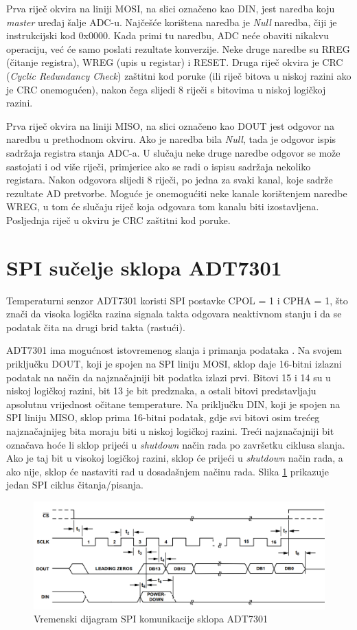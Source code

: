Prva riječ okvira na liniji MOSI, na slici označeno kao DIN, jest naredba koju \textit{master} uređaj šalje ADC-u. Najčešće korištena naredba je \textit{Null} naredba, čiji je instrukcijski kod 0x0000. Kada primi tu naredbu, ADC neće obaviti nikakvu operaciju, već će samo poslati rezultate konverzije. Neke druge naredbe su RREG (čitanje registra), WREG (upis u registar) i RESET. Druga riječ okvira je CRC (\textit{Cyclic Redundancy Check}) zaštitni kod poruke (ili riječ bitova u niskoj razini ako je CRC onemogućen), nakon čega slijedi 8 riječi s bitovima u niskoj logičkoj razini.

Prva riječ okvira na liniji MISO, na slici označeno kao DOUT jest odgovor na naredbu u prethodnom okviru. Ako je naredba bila \textit{Null}, tada je odgovor ispis sadržaja registra stanja ADC-a. U slučaju neke druge naredbe odgovor se može sastojati i od više riječi, primjerice ako se radi o ispisu sadržaja nekoliko registara. Nakon odgovora slijedi 8 riječi, po jedna za svaki kanal, koje sadrže rezultate AD pretvorbe. Moguće je onemogućiti neke kanale korištenjem naredbe WREG, u tom će slučaju riječ koja odgovara tom kanalu biti izostavljena. Posljednja riječ u okviru je CRC zaštitni kod poruke.


\section{SPI sučelje sklopa ADT7301}
Temperaturni senzor ADT7301 koristi SPI postavke CPOL = 1 i CPHA = 1, što znači da visoka logička razina signala takta odgovara neaktivnom stanju i da se podatak čita na drugi brid takta (rastući).

ADT7301 ima mogućnost istovremenog slanja i primanja podataka . Na svojem priključku DOUT, koji je spojen na SPI liniju MOSI, sklop daje 16-bitni izlazni podatak na način da najznačajniji bit podatka izlazi prvi. Bitovi 15 i 14 su u niskoj logičkoj razini, bit 13 je bit predznaka, a ostali bitovi predstavljaju apsolutnu vrijednost očitane temperature. Na priključku DIN, koji je spojen na SPI liniju MISO, sklop prima 16-bitni podatak, gdje svi bitovi osim trećeg najznačajnijeg bita moraju biti u niskoj logičkoj razini. Treći najznačajniji bit označava hoće li sklop prijeći u \textit{shutdown} način rada po završetku ciklusa slanja. Ako je taj bit u visokoj logičkoj razini, sklop će prijeći u \textit{shutdown} način rada, a ako nije, sklop će nastaviti rad u dosadašnjem načinu rada. Slika \ref{fig:adt7301_spi} prikazuje jedan SPI ciklus čitanja/pisanja.

\begin{figure}[htb]
    \centering
    \includegraphics[width=\textwidth]{slike/ADT7301_spi.png}
    \caption{Vremenski dijagram SPI komunikacije sklopa ADT7301 \cite{adt7301_datasheet}}
    \label{fig:adt7301_spi}
\end{figure}
    

